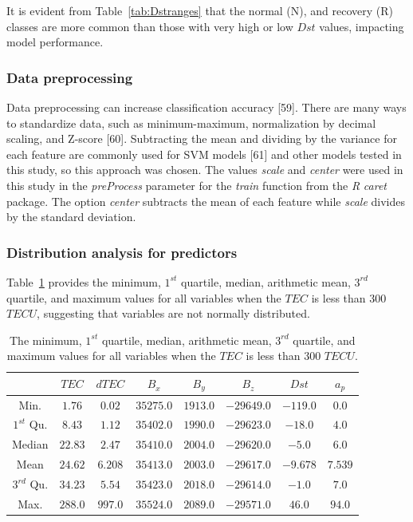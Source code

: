 \let\LaTeXcline\cline\documentclass[sn-mathphys-num]{sn-jnl}\let\cline\LaTeXcline
\begin{document}
It is evident from Table~\ref{tab:Dstranges} that the normal (N), and recovery (R) classes are more common than those with very high or low $Dst$ values, impacting model performance.

\subsubsection{Data preprocessing}

Data preprocessing can increase classification accuracy [59]. There are many ways to standardize data, such as minimum-maximum, normalization by decimal scaling, and Z-score [60]. Subtracting the mean and dividing by the variance for each feature are commonly used for SVM models [61] and other models tested in this study, so this approach was chosen. The values \textit{scale} and \textit{center} were used in this study in the \textit{preProcess} parameter for the \textit{train} function from the \textit{R} \textit{caret} package. The option \textit{center} subtracts the mean of each feature while \textit{scale} divides by the standard deviation.

\subsubsection{Distribution analysis for predictors}

Table~\ref{tab:minmax} provides the minimum, $1^{st}$ quartile, median, arithmetic mean, $3^{rd}$ quartile, and maximum values for all variables when the $TEC$ is less than $300$ $TECU$, suggesting that variables are not normally distributed.

\begin{table}[!ht]
    \centering
    \caption{The minimum, $1^{st}$ quartile, median, arithmetic mean, $3^{rd}$ quartile, and maximum values for all variables when the $TEC$ is less than $300$ $TECU$.}
    \label{tab:minmax}
        \begin{tabular}{|c|c|c|c|c|c|c|c|}
                \hline
                  & $TEC$ & $dTEC$ & $B_{x}$ & $B_{y}$ & $B_{z}$ & $Dst$ & $a_{p}$ \\ \hline
                Min. & $1.76$ & $0.02$ & $35275.0$ & $1913.0$ & $-29649.0$ & $-119.0$ & $0.0$ \\ \hline
                $1^{st}$ Qu. & $8.43$ & $1.12$ & $35402.0$ & $1990.0$ & $-29623.0$ & $-18.0$ & $4.0$ \\ \hline
                Median & $22.83$ & $2.47$ & $35410.0$ & $2004.0$ & $-29620.0$ & $-5.0$ & $6.0$ \\ \hline
                Mean & $24.62$ & $6.208$ & $35413.0$ & $2003.0$ & $-29617.0$ & $-9.678$ & $7.539$ \\ \hline
                $3^{rd}$ Qu. & $34.23$ & $5.54$ & $35423.0$ & $2018.0$ & $-29614.0$ & $-1.0$ & $7.0$ \\ \hline
                Max. & $288.0$ & $997.0$ & $35524.0$ & $2089.0$ & $-29571.0$ & $46.0$ & $94.0$ \\ \hline
        \end{tabular}
\end{table}
\end{document}
